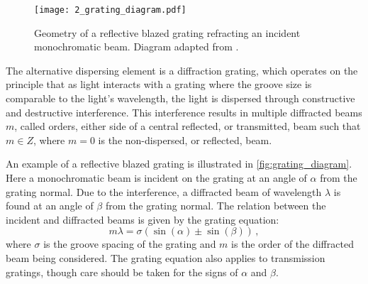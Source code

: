 \begin{figure}[t]
    \centering
    \texttt{[image: 2\_grating\_diagram.pdf]}
    \caption{Geometry of a reflective blazed grating refracting an incident monochromatic beam. Diagram adapted from \cite{BirneyObsAstro}.}
    \label{fig:grating_diagram}
\end{figure}

The alternative dispersing element is a diffraction grating, which operates on the principle that as light interacts with a grating where the groove size is comparable to the light's wavelength, the light is dispersed through constructive and destructive interference. This interference results in multiple diffracted beams $m$, called orders, either side of a central reflected, or transmitted, beam such that $m \in Z$, where $m = 0$ is the non-dispersed, or reflected, beam.

An example of a reflective blazed grating is illustrated in \autoref{fig:grating_diagram}. Here a monochromatic beam is incident on the grating at an angle of $\alpha$ from the grating normal. Due to the interference, a diffracted beam of wavelength $\lambda$ is found at an angle of $\beta$ from the grating normal. The relation between the incident and diffracted beams is given by the grating equation:
\begin{equation} \label{eq:grating_equation}
    m\lambda = \sigma (\sin(\alpha) \pm \sin(\beta))\,,
\end{equation}
where $\sigma$ is the groove spacing of the grating and $m$ is the order of the diffracted beam being considered. The grating equation also applies to transmission gratings, though care should be taken for the signs of $\alpha$ and $\beta$.


